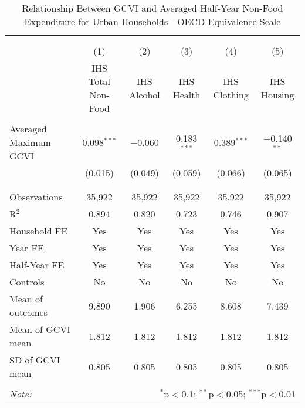 
\begin{table}[!htbp] \centering 
  \caption{Relationship Between GCVI and Averaged Half-Year Non-Food Expenditure for Urban Households - OECD Equivalence Scale} 
  \label{gcvi_table_7_1_urban.tex} 
\normalsize 
\begin{tabular}{@{\extracolsep{5pt}}lccccc} 
\\[-1.8ex]\hline 
\hline \\[-1.8ex] 
\\[-1.8ex] & (1) & (2) & (3) & (4) & (5)\\ 
 & IHS Total Non-Food & IHS Alcohol & IHS Health & IHS Clothing & IHS Housing \\ 
\hline \\[-1.8ex] 
 Averaged Maximum GCVI & 0.098$^{***}$ & $-$0.060 & 0.183$^{***}$ & 0.389$^{***}$ & $-$0.140$^{**}$ \\ 
  & (0.015) & (0.049) & (0.059) & (0.066) & (0.065) \\ 
  & & & & & \\ 
\hline \\[-1.8ex] 
Observations & 35,922 & 35,922 & 35,922 & 35,922 & 35,922 \\ 
R$^{2}$ & 0.894 & 0.820 & 0.723 & 0.746 & 0.907 \\ 
Household FE & Yes & Yes & Yes & Yes & Yes \\ 
Year FE & Yes & Yes & Yes & Yes & Yes \\ 
Half-Year FE & Yes & Yes & Yes & Yes & Yes \\ 
Controls & No & No & No & No & No \\ 
Mean of outcomes & 9.890 & 1.906 & 6.255 & 8.608 & 7.439 \\ 
Mean of GCVI mean & 1.812 & 1.812 & 1.812 & 1.812 & 1.812 \\ 
SD of GCVI mean & 0.805 & 0.805 & 0.805 & 0.805 & 0.805 \\ 
\hline \\[-1.8ex] 
\textit{Note:}  & \multicolumn{5}{r}{$^{*}$p$<$0.1; $^{**}$p$<$0.05; $^{***}$p$<$0.01} \\ 
\end{tabular} 
\end{table} 
